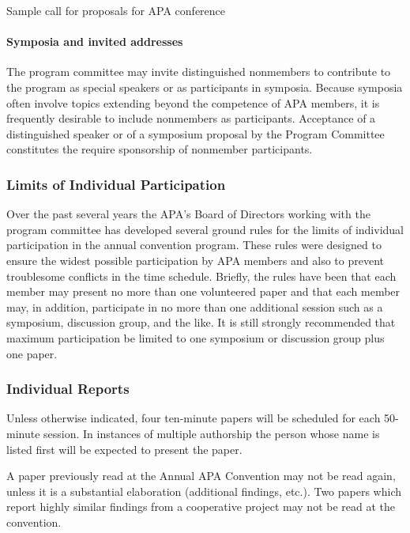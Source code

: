 \begin{refsection}
\begin{apatextbox}{Sample call for proposals for APA conference}
\paragraph{Symposia and invited addresses}
\label{symposiaandinvitedaddresses}

The program committee may invite distinguished nonmembers to contribute to the program as special speakers or as participants in symposia. Because symposia often involve topics extending beyond the competence of APA members, it is frequently desirable to include nonmembers as participants. Acceptance of a distinguished speaker or of a symposium proposal by the Program Committee constitutes the require sponsorship of nonmember participants.

\subsubsection{Limits of Individual Participation}
\label{limitsofindividualparticipation}

Over the past several years the APA's Board of Directors working with the program committee has developed several ground rules for the limits of individual participation in the annual convention program. These rules were designed to ensure the widest possible participation by APA members and also to prevent troublesome conflicts in the time schedule. Briefly, the rules have been that each member may present no more than one volunteered paper and that each member may, in addition, participate in no more than one additional session such as a symposium, discussion group, and the like. It is still strongly recommended that maximum participation be limited to one symposium or discussion group plus one paper.

\subsubsection{Individual Reports}
\label{individualreports}

Unless otherwise indicated, four ten-minute papers will be scheduled for each 50-minute session. In instances of multiple authorship the person whose name is listed first will be expected to present the paper.

A paper previously read at the Annual APA Convention may not be read again, unless it is a substantial elaboration (additional findings, etc.). Two papers which report highly similar findings from a cooperative project may not be read at the convention.


\end{apatextbox}
\end{refsection}
